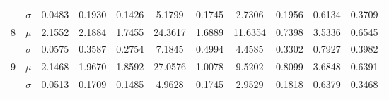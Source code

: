 \begin{table}[ht]
\begin{tabular}{ccccccccccc}
      & $\sigma$  & 0.0483 & 0.1930 & 0.1426 &  5.1799 & 0.1745 &  2.7306 & 0.1956 & 0.6134 & 0.3709\\
    8 & $\mu$     & 2.1552 & 2.1884 & 1.7455 & 24.3617 & 1.6889 & 11.6354 & 0.7398 & 3.5336 & 0.6545\\
      & $\sigma$  & 0.0575 & 0.3587 & 0.2754 &  7.1845 & 0.4994 &  4.4585 & 0.3302 & 0.7927 & 0.3982\\
    9 & $\mu$     & 2.1468 & 1.9670 & 1.8592 & 27.0576 & 1.0078 &  9.5202 & 0.8099 & 3.6848 & 0.6391\\
      & $\sigma$  & 0.0513 & 0.1709 & 0.1485 &  4.9628 & 0.1745 & 2.9529 & 0.1818 & 0.6379 & 0.3468\\
    \hline
  \end{tabular}
\end{table}

